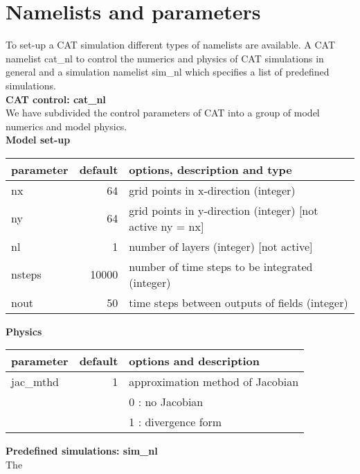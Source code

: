 \chapter{Namelists and parameters}
To set-up a CAT simulation different types of namelists are available. 
A CAT namelist cat{\_}nl to control the numerics and physics of CAT
simulations in general and a simulation namelist sim{\_}nl which specifies 
a list of predefined simulations.\\ 

\noindent
{\bf \Large CAT control: cat{\_}nl} \\
\noindent
We have subdivided the control parameters of CAT into a group of model
numerics and model physics. \\

\noindent
{\bf Model set-up} \\ 
\noindent
\begin{tabular}{|l|r|l|}
 \hline
 parameter & default & options, description and type \\
 \hline
 nx      &   64       & grid points in x-direction (integer) \\
 ny      &   64       & grid points in y-direction (integer) [not active ny = nx] \\
 nl      &   1        & number of layers (integer) [not active]  \\
 nsteps  &   10000    & number of time steps to be integrated (integer) \\
 nout    &   50       & time steps between outputs of fields (integer) \\
 \hline
\end{tabular} 

\vspace{0.5cm}

\noindent
{\bf Physics} \\ 
\noindent
\begin{tabular}{|l|r|l|}
 \hline
 parameter & default & options and description \\
 \hline
 jac{\_}mthd  &  1       & approximation method of Jacobian  \\
              &          & 0 : no Jacobian  \\
              &          & 1 : divergence form \\
 \hline
\end{tabular}

\vspace{0.5cm}
\noindent
{\bf \Large Predefined simulations: sim{\_}nl} \\
The 

